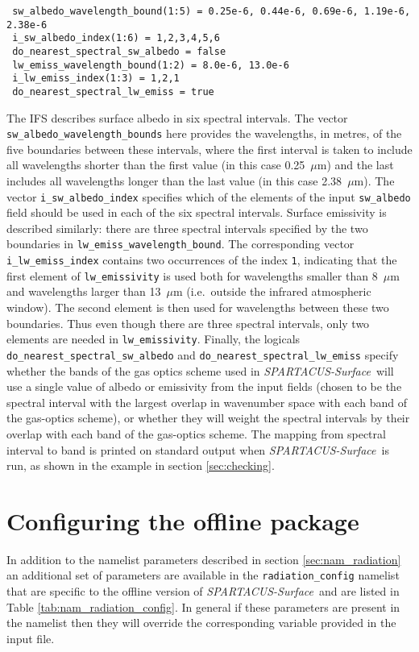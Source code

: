 \documentclass[a4,oneside]{article}
\def\codesize{\small}
\def\spsurf{\emph{SPARTACUS-Surface}}
\def\code#1{{\codesize\texttt{#1}}}
\begin{document}
\footnotesize
\begin{lstlisting}
 sw_albedo_wavelength_bound(1:5) = 0.25e-6, 0.44e-6, 0.69e-6, 1.19e-6, 2.38e-6
 i_sw_albedo_index(1:6) = 1,2,3,4,5,6
 do_nearest_spectral_sw_albedo = false
 lw_emiss_wavelength_bound(1:2) = 8.0e-6, 13.0e-6
 i_lw_emiss_index(1:3) = 1,2,1
 do_nearest_spectral_lw_emiss = true
\end{lstlisting}
\normalsize
%
The IFS describes surface albedo in six spectral intervals. The vector
\code{sw\_albedo\_wavelength\_bounds} here provides the wavelengths,
in metres, of the five boundaries between these intervals, where the
first interval is taken to include all wavelengths shorter than the
first value (in this case 0.25~$\mu$m) and the last includes all
wavelengths longer than the last value (in this case 2.38~$\mu$m). The
vector \code{i\_sw\_albedo\_index} specifies which of the elements of
the input \code{sw\_albedo} field should be used in each of the six
spectral intervals.  Surface emissivity is described similarly: there
are three spectral intervals specified by the two boundaries in
\code{lw\_emiss\_wavelength\_bound}. The corresponding vector
\code{i\_lw\_emiss\_index} contains two occurrences of the index
\code{1}, indicating that the first element of \code{lw\_emissivity}
is used both for wavelengths smaller than 8~$\mu$m and wavelengths
larger than 13~$\mu$m (i.e.\ outside the infrared atmospheric
window). The second element is then used for wavelengths between these
two boundaries. Thus even though there are three spectral intervals,
only two elements are needed in \code{lw\_emissivity}.  Finally, the
logicals \code{do\_nearest\_spectral\_sw\_albedo} and
\code{do\_nearest\_spectral\_lw\_emiss} specify whether the bands of
the gas optics scheme used in \spsurf\ will use a single value of
albedo or emissivity from the input fields (chosen to be the spectral
interval with the largest overlap in wavenumber space with each band
of the gas-optics scheme), or whether they will weight the spectral
intervals by their overlap with each band of the gas-optics
scheme. The mapping from spectral interval to band is printed on
standard output when \spsurf\ is run, as shown in the example in
section \ref{sec:checking}.


\section{Configuring the offline package}
\label{sec:nam_radiation_config}
In addition to the namelist parameters described in section
\ref{sec:nam_radiation} an additional set of parameters are available
in the \code{radiation\_config} namelist that are specific to the
offline version of \spsurf\ and are listed in Table
\ref{tab:nam_radiation_config}. In general if these parameters are
present in the namelist then they will override the corresponding
variable provided in the input file.
\end{document}
